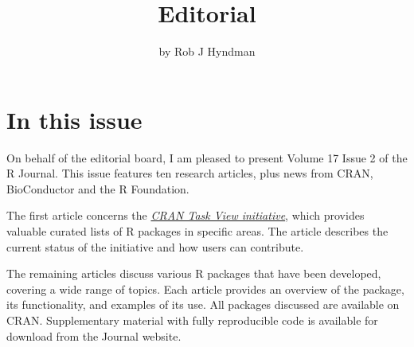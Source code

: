 \title{Editorial}


\author{by Rob J Hyndman}

\maketitle


\section*{In this issue}\label{in-this-issue}

On behalf of the editorial board, I am pleased to present Volume 17 Issue 2 of the R Journal. This issue features ten research articles, plus news from CRAN, BioConductor and the R Foundation.

The first article concerns the \href{https://cran.r-project.org/web/views/}{\emph{CRAN Task View initiative}}, which provides valuable curated lists of R packages in specific areas. The article describes the current status of the initiative and how users can contribute.

The remaining articles discuss various R packages that have been developed, covering a wide range of topics. Each article provides an overview of the package, its functionality, and examples of its use. All packages discussed are available on CRAN. Supplementary material with fully reproducible code is available for download from the Journal website.


\address{%
Rob J Hyndman\\
Monash University\\%
\\
%
\url{https://journal.r-project.org}\\%
%
\href{mailto:r-journal@r-project.org}{\nolinkurl{r-journal@r-project.org}}%
}
